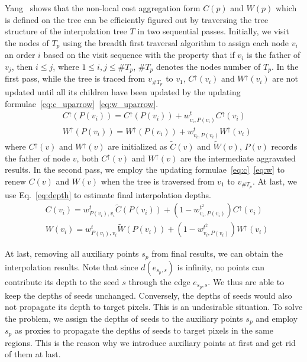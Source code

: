\documentclass[preprint,10pt,5p,times,twocolumn]{elsarticle}
\begin{document}
Yang~\cite{Yang2012} shows that the non-local cost aggregation form $C(p)$ and $W(p)$ which is defined on the tree can be efficiently figured out by traversing the tree structure of the interpolation tree $T$ in two sequential passes. Initially, we visit the nodes of $T_p$ using the breadth first traversal algorithm to assign each node $v_i$ an order $i$ based on the visit sequence with the property that if $v_i$ is the father of $v_j$, then $i \leqslant j$, where $ 1 \leqslant i,j \leqslant \#T_p$, $\#T_p$ denotes the nodes number of $T_p$. In the first pass, while the tree is traced from $v_{\#T_p}$ to $v_{1}$, ${C^ \uparrow }(v_i)$ and ${W^ \uparrow }(v_i)$ are not updated until all its children have been updated by the updating formulae~\eqref{eq:c_uparrow}~\eqref{eq:w_uparrow}.
%
\begin{align}
&{{C}^ \uparrow }(P(v_i)) = {{C}^ \uparrow }(P(v_i)) + {{w^t_{v_i,P(v_i)}}{{C}^ \uparrow }(v_i)} \label{eq:c_uparrow}\\
&{{W}^ \uparrow }(P(v_i)) = {{W}^ \uparrow }(P(v_i)) + {{w^t_{v_i,P(v_i)}}{{W}^ \uparrow }(v_i)} \label{eq:w_uparrow}
\end{align}
%
where ${C^ \uparrow }(v)$ and ${W^ \uparrow }(v)$ are initialized as $\widetilde{C}(v)$ and $\widetilde{W}(v)$, $P(v)$ records the father of node $v$, both ${C^ \uparrow }(v)$ and ${W^ \uparrow }(v)$ are the intermediate aggravated results. In the second pass, we employ the updating formulae~\eqref{eq:c}~\eqref{eq:w} to renew $C(v)$ and $W(v)$ when the tree is traversed from $v_1$ to $v_{\#T_p}$. At last, we use Eq.~\eqref{eq:depth} to estimate final interpolation depths.
%
\begin{align}
& C(v_i) = {w^t_{P(v_i),v_i}}{\widetilde{C}({P(v_i)})} + (1 - {w^{t^2}_{v_i,P(v_i)}}){C^ \uparrow }(v_i) \label{eq:c}\\
& W(v_i) = {w^t_{P(v_i),v_i}}{\widetilde{W}({P(v_i)})} + (1 - {w^{t^2}_{v_i,P(v_i)}}){W^ \uparrow }(v_i) \label{eq:w}
\end{align}
%

At last, removing all auxiliary points $s_p$ from final results, we can obtain the interpolation results. Note that since $d(e_{s_p, s})$ is infinity, no points can contribute its depth to the seed $s$ through the edge $e_{s_p, s}$. We thus are able to keep the depths of seeds unchanged. Conversely, the depths of seeds would also not propagate its depth to target pixels. This is an undesirable situation. To solve the problem, we assign the depths of seeds to the auxiliary points $s_p$ and employ $s_p$ as proxies to propagate the depths of seeds to target pixels in the same regions. This is the reason why we introduce auxiliary points at first and get rid of them at last.
\end{document}
